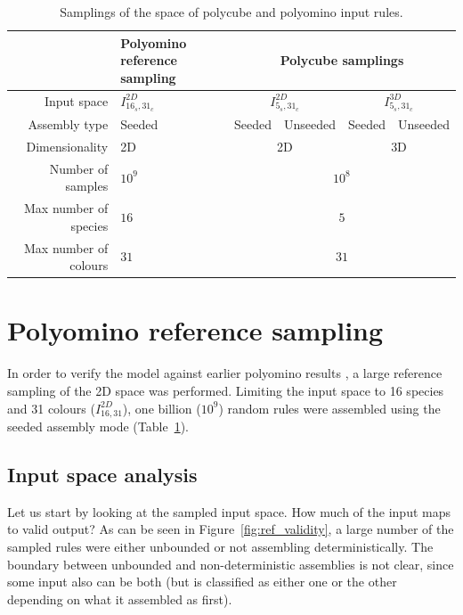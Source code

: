 \begin{table}[h!]
    \centering
    \begin{tabular}{|r||p{2cm}|c|c|c|c|}
        \hline
                                & Polyomino reference sampling & \multicolumn{4}{|c|}{Polycube samplings} \\ \hline\hline
        Input space             & \(I_{16_s,31_c}^{2D}\) & \multicolumn{2}{|c|}{\(I_{5_s,31_c}^{2D}\)} & \multicolumn{2}{|c|}{\(I_{5_s,31_c}^{3D}\)} \\ \hline
        Assembly type           & Seeded & Seeded & Unseeded & Seeded & Unseeded \\ \hline
        Dimensionality          & 2D & \multicolumn{2}{|c|}{2D} & \multicolumn{2}{|c|}{3D} \\ \hline
        Number of samples       & \(10^9\) & \multicolumn{4}{|c|}{\(10^8\)} \\ \hline
        Max number of species   & \(16\) & \multicolumn{4}{|c|}{\(5\)} \\ \hline
        Max number of colours   & \(31\) & \multicolumn{4}{|c|}{\(31\)}\\ \hline
    \end{tabular}
    \caption{Samplings of the space of polycube and polyomino input rules.}
    \label{tab:polycubeSamplings}
\end{table}

\section{Polyomino reference sampling}
\label{sec:refcalc}
In order to verify the model against earlier polyomino results \cite{johnston2021}, a large reference sampling of the 2D space was performed. Limiting the input space to 16 species and 31 colours (\(I_{16,31}^{2D}\)), one billion (\(10^9\)) random rules were assembled using the seeded assembly mode (Table~\ref{tab:polycubeSamplings}).

\subsection{Input space analysis}

Let us start by looking at the sampled input space. How much of the input maps to valid output? As can be seen in Figure~\ref{fig:ref_validity}, a large number of the sampled rules were either unbounded or not assembling deterministically. The boundary between unbounded and non-deterministic assemblies is not clear, since some input also can be both (but is classified as either one or the other depending on what it assembled as first).

